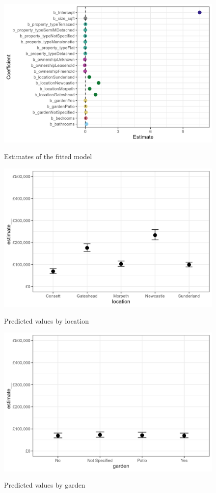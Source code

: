 \documentclass{scrartcl}
\begin{document}
\begin{figure}[htbp]
	\includegraphics[width = \textwidth]{../figures/estimates.png}
	\label{fig:estimates}
	\caption{Estimates of the fitted model}
\end{figure}

\begin{figure}[htbp]
	\includegraphics[width = \textwidth]{../figures/celocation.png}
	\label{fig:celocation}
	\caption{Predicted values by location}
\end{figure}

\begin{figure}[htbp]
	\includegraphics[width = \textwidth]{../figures/cegarden.png}
	\label{fig:cegarden}
	\caption{Predicted values by garden}
\end{figure}
\end{document}
